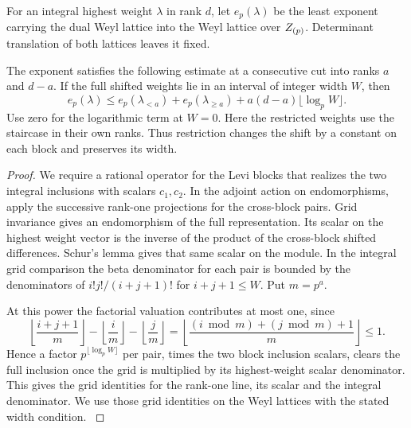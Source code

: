For an integral highest weight \(\lambda\) in rank \(d\), let
\(e_p(\lambda)\) be the least exponent carrying the dual Weyl
lattice into the Weyl lattice over \(Z_{(p)}\). Determinant
translation of both lattices leaves it fixed.

\begin{lemma}
\label{lem:consecutive-weyl-cut}
The exponent satisfies the following estimate at a consecutive cut into ranks
\(a\) and \(d-a\). If the full shifted weights lie in an interval
of integer width \(W\), then
\begin{equation}\label{eq:lift-weyl-cut}
 e_p(\lambda)\le e_p(\lambda_{<a})+e_p(\lambda_{\ge a})
                   +a(d-a)\lfloor\log_p W\rfloor .
\end{equation}
Use zero for the logarithmic term at \(W=0\). Here the
restricted weights use the staircase in their own ranks.
Thus restriction changes the shift by a constant on each block
and preserves its width. \end{lemma}

\begin{proof}
We require a rational operator for the Levi blocks that realizes the two integral inclusions with scalars \(c_1,c_2\). In the adjoint action on endomorphisms,
apply the successive rank-one projections for the cross-block
pairs. Grid invariance gives an endomorphism of the full
representation. Its scalar on the highest weight vector is the
inverse of the product of the cross-block shifted differences.
Schur's lemma gives that same scalar on the module. In the
integral grid comparison the beta denominator for each pair
is bounded by the denominators of
\(i!j!/(i+j+1)!\) for \(i+j+1\le W\). Put \(m=p^a\).

At this power the factorial valuation contributes at most one, since
\[
 \left\lfloor\frac{i+j+1}{m}\right\rfloor-\left\lfloor\frac{i}{m}\right\rfloor-\left\lfloor\frac{j}{m}\right\rfloor=\left\lfloor\frac{(i\bmod m)+(j\bmod m)+1}{m}\right\rfloor\le1 .
\] Hence a factor
\(p^{\lfloor\log_p W\rfloor}\) per pair, times the two block
inclusion scalars, clears the full inclusion once the grid is
multiplied by its highest-weight scalar denominator. This gives the grid identities for the rank-one line, its scalar and the integral denominator. We use those grid identities
on the Weyl lattices with the stated width condition.
\label{cor:lift-exponent-primes-2}

\end{proof}

